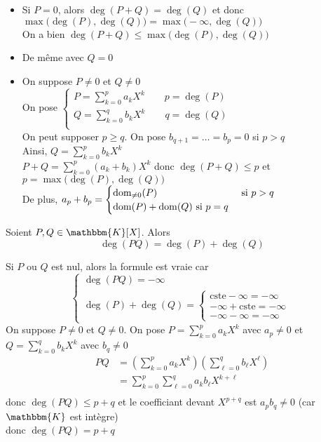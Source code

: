 \begin{prv}
	\begin{itemize}
		\item Si $P = 0$, alors $\deg(P+Q) = \deg(Q)$ et donc $\max\big(\deg(P), \deg(Q)\big) = \max\big(-\infty, \deg(Q)\big)$\\
			On a bien $\deg(P+Q) \le \max\big(\deg(P), \deg(Q)\big)$
		\item De même avec $Q = 0$
		\item On suppose $P \neq 0$ et $Q \neq 0$ \\
			On pose $\begin{cases}
				P = \sum_{k=0}^p a_k X^k \qquad p = \deg(P)\\
				Q = \sum_{k=0}^q b_k X^k \qquad q = \deg(Q)\\
			\end{cases}$ \\
			On peut supposer $p\ge q$. On pose $b_{q+1} = \ldots = b_p = 0$ si $p > q$ \\
			Ainsi, $Q = \sum_{k=0}^p b_kX^k$\\
			$P+Q = \sum_{k=0}^p (a_k + b_k) X^k$ donc $\deg(P+Q) \le p$ et $p = \max\big(\deg(P), \deg(Q)\big)$\\
			De plus, $a_p + b_p = \begin{cases}
				\operatorname*{dom}_{\neq 0}(P) &\text{ si } p > q\\
				\operatorname*{dom}(P) + \operatorname*{dom}(Q) \text{ si } p = q
			\end{cases}$
	\end{itemize}
\end{prv}

\begin{prop}
	Soient $P, Q \in \mathbbm{K}[X]$. Alors \[
		\deg(PQ) = \deg(P) + \deg(Q)
	\] 
\end{prop}

\begin{prv}
	Si $P$ ou $Q$ est nul, alors la formule est vraie car \[
		\begin{cases}
			\deg(PQ) = -\infty\\
			\deg(P) + \deg(Q) = \begin{cases}
				\mathrm{cste} - \infty = -\infty\\
				-\infty + \mathrm{cste} = -\infty\\
				-\infty - \infty = -\infty
			\end{cases}
		\end{cases}
	\] On suppose $P \neq 0$ et $Q \neq 0$. On pose $P = \sum_{k=0}^p a_k X^k$ avec $a_p \neq 0$ et $Q = \sum_{k=0}^q b_k X^k$ avec $b_q \neq 0$
	\begin{align*}
		PQ &= \left( \sum_{k=0}^p a_k X^k \right) \left( \sum_{\ell=0}^q b_\ell X^\ell \right) \\
		&= \sum_{k=0}^p \sum_{\ell=0}^q a_k b_{\ell} X^{k+\ell} \\
	\end{align*}
	donc $\deg(PQ) \le p+q$ et le coefficiant devant $X^{p+q}$ est $a_p b_q \neq 0$ (car $\mathbbm{K}$ est intègre)\\
	donc $\deg(PQ) = p+q$
\end{prv}
